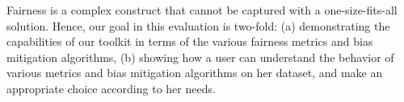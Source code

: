 \documentclass{article}
\begin{document}

\label{sec:eval_algs}
Fairness is a complex construct that cannot be captured with a one-size-fits-all solution. Hence, our goal in this evaluation is two-fold: (a) demonstrating the capabilities of our toolkit in terms of the various fairness metrics and bias mitigation algorithms, (b) showing how a user can understand the behavior of various metrics and bias mitigation algorithms on her dataset, and make an appropriate choice according to her needs. 
\end{document}
